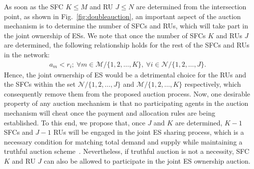 \documentclass[journal,10pt]{IEEEtran}
\begin{document}
As soon as the SFC $K\leq M$ and RU $J\leq N$ are determined from the intersection point, as shown in Fig.~\ref{fig:doubleauction}, an important aspect of the auction mechanism is to determine the number of SFCs and RUs, which will take part in the joint ownership of ESs. We note that once the number of SFCs $K$ and RUs $J$ are determined, the following relationship holds for the rest of the SFCs and RUs in the network:
\begin{eqnarray}
 a_m<r_i;~\forall m\in\mathcal{M}/\{1,2,\hdots,K\},~\forall i\in\mathcal{N}/\{1,2,\hdots,J\}.
\end{eqnarray}
Hence, the joint ownership of ES would be a detrimental choice for the RUs and the SFCs within the set $\mathcal{N}/\{1,2,\hdots,J\}$ and $\mathcal{M}/\{1,2,\hdots,K\}$ respectively, which consequently remove them from the proposed auction process. Now, one desirable property of any auction mechanism is that no participating agents in the auction mechanism will cheat once the payment and allocation rules are being established. To this end, we propose that, once $J$ and $K$ are determined, $K-1$  SFCs and $J-1$ RUs will be engaged in the joint ES sharing process, which is a necessary condition for matching total demand and supply while maintaining a truthful auction scheme~\cite{Huang-doubleauction:2002}. Nevertheless, if truthful auction is not a necessity, SFC $K$ and RU $J$ can also be allowed to participate in the joint ES ownership auction.
\end{document}
